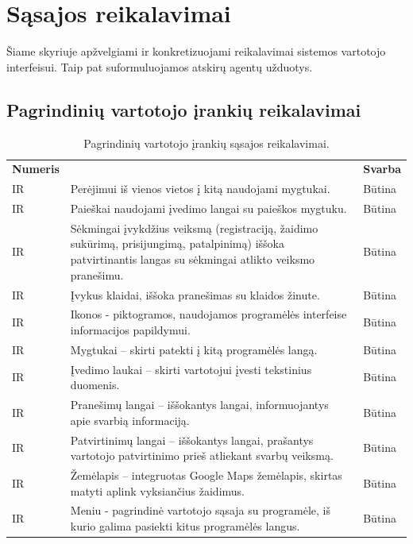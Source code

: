 \documentclass{VUMIFPSkursinis}
\begin{document}
\section{Sąsajos reikalavimai}
Šiame skyriuje apžvelgiami ir konkretizuojami reikalavimai sistemos vartotojo interfeisui. Taip pat suformuluojamos atskirų agentų užduotys.

\newcommand\rownumberir{\stepcounter{ircount}\arabic{ircount}}

\subsection{Pagrindinių vartotojo įrankių reikalavimai}
\begin{longtable}{ | >{\centering}m{2cm} | m{10cm} | >{\centering}m{2.5cm} | } \caption{Pagrindinių vartotojo įrankių sąsajos reikalavimai.} \endhead \hline
\multicolumn{3}{ |l| }{\textbf{Pagrindinių vartotojo įrankių reikalavimai}} \tabularnewline \hline
\textbf{Numeris} & \centering{\textbf{Reikalavimas}} & \textbf{Svarba} \tabularnewline \hline
IR\rownumberir & Perėjimui iš vienos vietos į kitą naudojami mygtukai. & Būtina\tabularnewline \hline
IR\rownumberir & Paieškai naudojami įvedimo langai su paieškos mygtuku. & Būtina\tabularnewline \hline
IR\rownumberir & Sėkmingai įvykdžius veiksmą (registraciją, žaidimo sukūrimą, prisijungimą, patalpinimą) iššoka patvirtinantis langas su sėkmingai atlikto veiksmo pranešimu. & Būtina\tabularnewline \hline
IR\rownumberir & Įvykus klaidai, iššoka pranešimas su klaidos žinute. & Būtina\tabularnewline \hline
IR\rownumberir & Ikonos - piktogramos, naudojamos programėlės interfeise informacijos papildymui. & Būtina\tabularnewline \hline
IR\rownumberir & Mygtukai – skirti patekti į kitą programėlės langą. & Būtina\tabularnewline \hline
IR\rownumberir & Įvedimo laukai – skirti vartotojui įvesti tekstinius duomenis. & Būtina\tabularnewline \hline
IR\rownumberir & Pranešimų langai – iššokantys langai, informuojantys apie svarbią informaciją. & Būtina\tabularnewline \hline
IR\rownumberir & Patvirtinimų langai – iššokantys langai, prašantys vartotojo patvirtinimo prieš atliekant svarbų veiksmą. & Būtina\tabularnewline \hline
IR\rownumberir & Žemėlapis – integruotas Google Maps žemėlapis, skirtas matyti aplink vyksiančius žaidimus. & Būtina\tabularnewline \hline
IR\rownumberir & Meniu - pagrindinė vartotojo sąsaja su programėle, iš kurio galima pasiekti kitus programėlės langus. & Būtina\tabularnewline \hline
\end{longtable}
\end{document}
